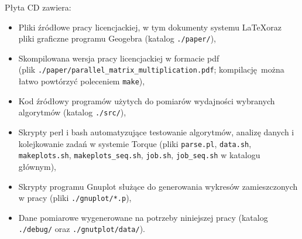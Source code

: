 Płyta CD zawiera:
\begin{itemize}
\item Pliki źródłowe pracy licencjackiej, w tym dokumenty systemu \LaTeX  oraz pliki graficzne programu Geogebra (katalog \texttt{./paper/}),
\item Skompilowana wersja pracy licencjackiej w formacie pdf\\(plik \texttt{./paper/parallel\_matrix\_multiplication.pdf}; kompilację można łatwo powtórzyć poleceniem \texttt{make}),
\item Kod źródłowy programów użytych do pomiarów wydajności wybranych algorytmów (katalog \texttt{./src/}),
\item Skrypty perl i bash automatyzujące testowanie algorytmów, analizę danych i kolejkowanie zadań w systemie Torque (pliki \texttt{parse.pl}, \texttt{data.sh}, \texttt{makeplots.sh}, \texttt{makeplots\_seq.sh}, \texttt{job.sh}, \texttt{job\_seq.sh} w katalogu głównym),
\item Skrypty programu Gnuplot służące do generowania wykresów zamieszczonych w pracy (pliki \texttt{./gnuplot/*.p}),
\item Dane pomiarowe wygenerowane na potrzeby niniejszej pracy (katalog \texttt{./debug/} oraz \texttt{./gnutplot/data/}).
\end{itemize}